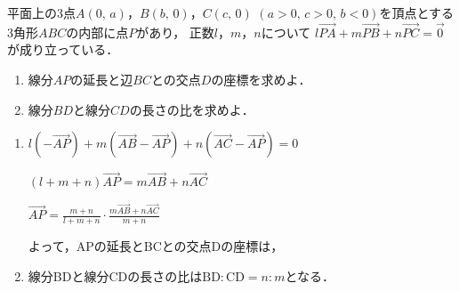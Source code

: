 \begin{problem}
  平面上の3点$A(0, \, a)$，$B(b, \, 0)$，$C(c, \, 0)$ $(a>0, \, c>0, \, b<0)$を頂点とする
3角形$ABC$の内部に点$P$があり，
正数$l$，$m$，$n$について
$l\overrightarrow{PA}+m\overrightarrow{PB}+n\overrightarrow{PC}=\overrightarrow{0}$が成り立っている．
\begin{enumerate}
\item 線分$AP$の延長と辺$BC$との交点$D$の座標を求めよ．
\item 線分$BD$と線分$CD$の長さの比を求めよ．
\end{enumerate}
\end{problem}

\begin{enumerate}
  \item $l(-\Vec{AP}) + m(\Vec{AB}-\Vec{AP}) + n(\Vec{AC}-\Vec{AP}) = 0$

$(l+m+n)\Vec{AP} = m\Vec{AB} + n\Vec{AC}$

$\Vec{AP} = \frac{m+n}{l+m+n}\cdot \frac{m\Vec{AB} + n\Vec{AC}}{m+n}$

よって，APの延長とBCとの交点Dの座標は，

\item 線分BDと線分CDの長さの比は$\mathrm{BD}:\mathrm{CD} = n:m$となる．
\end{enumerate}

